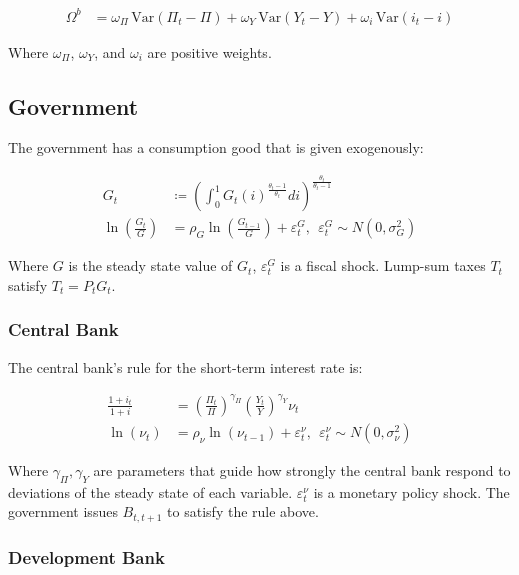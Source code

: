 \documentclass[12pt]{article}
\begin{document}
\begin{align*}
    \Omega^{b}&=\omega_{\Pi}\,\mathrm{Var}(\Pi_{t}-\Pi)+\omega_{Y}\,\mathrm{Var}(Y_{t}-Y)+\omega_{i}\,\mathrm{Var}(i_{t}-i)
\end{align*}

Where $\omega_\Pi$, $\omega_Y$, and $\omega_i$ are positive weights.


\subsection{Government}

The government has a consumption good that is given exogenously:

\begin{align*}
    G_t &\coloneqq \left(\int_0^1G_t(i)^{\frac{\theta_t - 1}{\theta_t}} di\right)^{\frac{\theta_t}{\theta_t - 1}}\\
    \ln \left(\frac{G_t}{G}\right) &= \rho_G \ln \left(\frac{G_{t-1}}{G}\right) + \varepsilon_t^G, ~~ \varepsilon_t^G \sim N(0, \sigma^2_G)
\end{align*}

Where $G$ is the steady state value of $G_t$, $\varepsilon_t^G$ is a fiscal shock. Lump-sum taxes $T_t$ satisfy $T_t = P_tG_t$.


\subsubsection{Central Bank}

The central bank's rule for the short-term interest rate is:

\begin{align*}
    \frac{1 + i_t}{1 + i} &= \left(\frac{\Pi_t}{\Pi}\right)^{\gamma_\Pi}\left(\frac{Y_t}{Y}\right)^{\gamma_Y} \nu_t\\
    \ln(\nu_t) &= \rho_\nu \ln(\nu_{t-1}) + \varepsilon_t^\nu, ~~ \varepsilon_t^\nu \sim N(0, \sigma^2_\nu)
\end{align*}

Where $\gamma_\Pi, \gamma_Y$ are parameters that guide how strongly the central bank respond to deviations of the steady state of each variable. $\varepsilon_t^\nu$ is a monetary policy shock. The government issues $B_{t,t+1}$ to satisfy the rule above.


\subsubsection{Development Bank}
\end{document}

